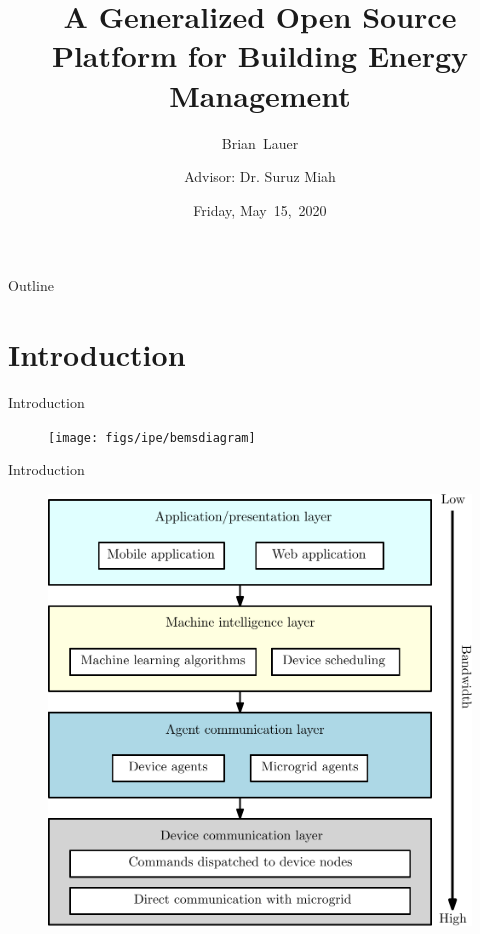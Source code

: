 \documentclass{beamer}
\title[Progress Update]{A Generalized Open Source Platform for Building Energy Management}
\author[B.~Lauer]{Brian~Lauer\\\and
Advisor: Dr. Suruz Miah}
\institute[Bradley University] %
{
  Department of Electrical and Computer Engineering\\
  Bradley University\\
  1501 W. Bradley Avenue\\
  Peoria, IL, 61625, USA
}
\date[May~15,~2020]{Friday, May~15,~2020}
\begin{document}
\begin{frame}
  \titlepage
\end{frame}

\begin{frame}{Outline}
  \tableofcontents
\end{frame}

\section{Introduction}

\begin{frame}{Introduction}{}
  \begin{figure}
  	\texttt{[image: figs/ipe/bemsdiagram]}
  \end{figure}
\end{frame}

\begin{frame}{Introduction}{}
	\begin{figure}
		\includegraphics[scale=0.4]{figs/ipe/BEMS-softwareArchitecture}
	\end{figure}
\end{frame}
\end{document}
